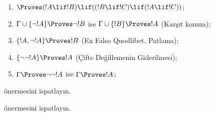 \begin{prop}
\begin{enumerate}
\item $\Proves (!A \lif !B) \lif ((!B \lif !C)
  \lif (!A \lif !C))$; 
\item $\Gamma \cup \{ \lnot !A\} \Proves \lnot !B$ ise
  $\Gamma \cup \{ !B\} \Proves !A$ (Karşıt konum); 
\item $\{ !A, \lnot!A\} \Proves !B$ (Ex Falso Quodlibet, Patlama);
\item $\{ \lnot\lnot!A\} \Proves !A$ (Çifte Değillemenin Giderilmesi);
\item $\Gamma \Proves \lnot\lnot!A$ ise $\Gamma \Proves !A$;
\end{enumerate}
\end{prop}

\begin{prob}
   önermesini ispatlayın.
\end{prob}
\tagendprob

\begin{prob}
   önermesini ispatlayın.
\end{prob}
\tagendprob

